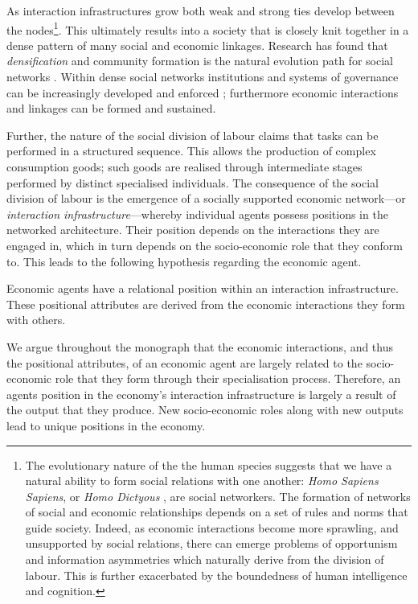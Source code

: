 As interaction infrastructures grow both weak and strong ties develop between the nodes\footnote{The evolutionary nature of the the human species suggests that we have a natural ability to form social relations with one another: \emph{Homo Sapiens Sapiens}, or \emph{Homo Dictyous} \citep{ChristakisFowler2009}, are social networkers. The formation of networks of social and economic relationships depends on a set of rules and norms that guide society. Indeed, as economic interactions become more sprawling, and unsupported by social relations, there can emerge problems of opportunism and information asymmetries which naturally derive from the division of labour. This is further exacerbated by the boundedness of human intelligence and cognition.}. This ultimately results into a society that is closely knit together in a dense pattern of many social and economic linkages. Research has found that \emph{densification} and community formation is the natural evolution path for social networks \citep{Leskovec2005a, Leskovec2007a, Leskovec2008}. Within dense social networks institutions and systems of governance can be increasingly developed and enforced \citep{North1989, North1990}; furthermore economic interactions and linkages can be formed and sustained.

Further, the nature of the social division of labour claims that tasks can be performed in a structured sequence. This allows the production of complex consumption goods; such goods are realised through intermediate stages performed by distinct specialised individuals. The consequence of the social division of labour is the emergence of a socially supported economic network---or \emph{interaction infrastructure}---whereby individual agents possess positions in the networked architecture. Their position depends on the interactions they are engaged in, which in turn depends on the socio-economic role that they conform to. This leads to the following hypothesis regarding the economic agent.

\begin{lemma} \label{con:positionalattributes}
Economic agents have a relational position within an interaction infrastructure. These positional attributes are derived from the economic interactions they form with others.
\end{lemma}

We argue throughout the monograph that the economic interactions, and thus the positional attributes, of an economic agent are largely related to the socio-economic role that they form through their specialisation process. Therefore, an agents position in the economy's interaction infrastructure is largely a result of the output that they produce. New socio-economic roles along with new outputs lead to unique positions in the economy.

